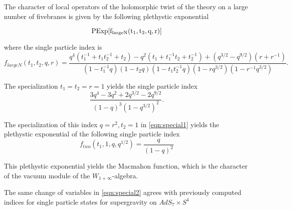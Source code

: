 \documentclass[11pt]{amsart}
\begin{document}
\parsec


\begin{prop}
  The character of local operators of the holomorphic twist of the theory on a large number of fivebranes is given by the following plethystic exponential

  \[ \rm PExp [f_{large N}(t_{1}, t_{2}, q, r)] \]

  where the single particle index is \[f_{large N}(t_{1}, t_{2}, q, r) = \frac{q^4(t_1^{-1}+t_1t_2^{-1}+t_2)-q^2(t_1+t_1^{-1}t_2+t_2^{-1})+(q^{3/2}-q^{9/2})(r+r^{-1})}{(1-t_{1}^{-1}q)(1-t_{2}q)(1-t_{1}t_{2}^{-1}q)(1-rq^{3/2})(1-r^{-1}q^{3/2})}.\]
\end{prop}

\parsec

The specialization $t_1=t_2=r=1$ yields the single particle index
\[
\frac{3 q^4 - 3 q^2 + 2 q^{3/2} - 2 q^{9/2}}{(1-q)^3 (1-q^{3/2})^2} .
\]

\parsec 
The specialization of this index $q=r^2, t_2=1$ in \eqref{eqn:special1} yields the plethystic exponential of the following single particle index
\[
f_{two}(t_1, 1, q, q^{1/2}) = \frac{q}{(1-q)^2}
\]

This plethystic exponential yields the Macmahon function, which is the character of the vacuum module of the $W_{1+\infty}$-algebra.

\parsec The same change of variables in \eqref{eqn:special2} agrees with previously computed indices for single particle states for supergravity on $AdS_{7}\times S^{4}$ 
\end{document}
